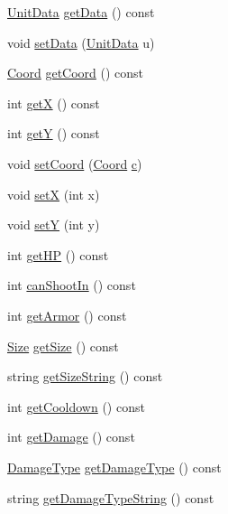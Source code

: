 \begin{DoxyCompactItemize}
\hyperlink{structghost_1_1UnitData}{Unit\-Data} \hyperlink{classghost_1_1Unit_a6b14edf653460aee0f626c8e969e82c2}{get\-Data} () const 
\item 
void \hyperlink{classghost_1_1Unit_ab9f6b7f97d9249a1ceb5606da2440a20}{set\-Data} (\hyperlink{structghost_1_1UnitData}{Unit\-Data} u)
\item 
\hyperlink{structghost_1_1Coord}{Coord} \hyperlink{classghost_1_1Unit_a38416cbe7886c2ec428d22273c29ab5d}{get\-Coord} () const 
\item 
int \hyperlink{classghost_1_1Unit_a415bb28bec1802f78ff3e9470d65f960}{get\-X} () const 
\item 
int \hyperlink{classghost_1_1Unit_a104cdedcd5cea24e09088ab26f4bdf47}{get\-Y} () const 
\item 
void \hyperlink{classghost_1_1Unit_a0cb26e44e2ff004a35d479bff4106ab7}{set\-Coord} (\hyperlink{structghost_1_1Coord}{Coord} \hyperlink{namespaceghost_a1e04a626798fce7a46db973e9693354e}{c})
\item 
void \hyperlink{classghost_1_1Unit_a999285545f43bd798853ba5e8b00bb22}{set\-X} (int x)
\item 
void \hyperlink{classghost_1_1Unit_a1da9f131e6f919f61ac817281c848e71}{set\-Y} (int y)
\item 
int \hyperlink{classghost_1_1Unit_ac0d8e38d05ba0947677a32f88c5b46e4}{get\-H\-P} () const 
\item 
int \hyperlink{classghost_1_1Unit_a53e356c8dcd356e5c2d18e6c8dc508c9}{can\-Shoot\-In} () const 
\item 
int \hyperlink{classghost_1_1Unit_ab86ea22fa11f848af6795da5d11d4f26}{get\-Armor} () const 
\item 
\hyperlink{namespaceghost_a2615b54cc16a8c95ffeeb246ad722833}{Size} \hyperlink{classghost_1_1Unit_aa5176ff5dfee4be4f3508e8c59b77d08}{get\-Size} () const 
\item 
string \hyperlink{classghost_1_1Unit_a098cc525d219966d0c51f5d437e958ea}{get\-Size\-String} () const 
\item 
int \hyperlink{classghost_1_1Unit_a431aa469dc819c762cc28e1729c422c9}{get\-Cooldown} () const 
\item 
int \hyperlink{classghost_1_1Unit_a5e1ea40f45d3dd61bf6aee5c15da5378}{get\-Damage} () const 
\item 
\hyperlink{namespaceghost_ab52582bfe39e47fc05f33770f38185d6}{Damage\-Type} \hyperlink{classghost_1_1Unit_a9c803b150c878b49aab88a5fb5d177bf}{get\-Damage\-Type} () const 
\item 
string \hyperlink{classghost_1_1Unit_a9bdd8172a7f3244c038ac3c691a102b4}{get\-Damage\-Type\-String} () const 

\end{DoxyCompactItemize}
